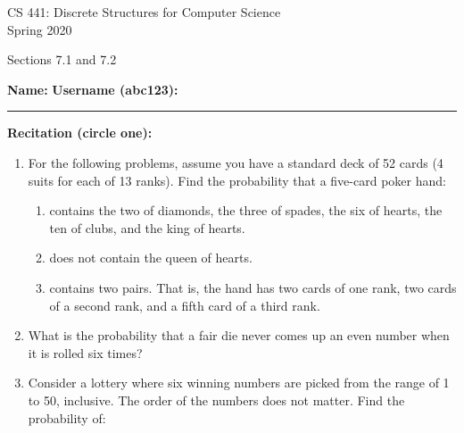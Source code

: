 \documentclass[12pt]{article}
\begin{document}
\begin{center}
CS 441: Discrete Structures for Computer Science \\
{\smaller[1] Spring 2020} \\

\vspace {0.25in}

Sections 7.1 and 7.2
\end{center}

\vspace{0.25in}

{\smaller[1]
\textbf{Name:} \hrulefill
\hspace{1em}
\textbf{Username (abc123):} \rule{1.25in}{0.4pt}

\null \textbf{Recitation (circle one):}
\hfill
}

\begin{enumerate} %


\item For the following problems, assume you have a standard deck of 52 cards (4
suits for each of 13 ranks). Find the probability that a five-card poker hand:
%
\begin{enumerate}[itemsep=\fill,after=\vfill\vfill] %

\item contains the two of diamonds, the three of spades, the six of hearts, the
ten of clubs, and the king of hearts.

\item does not contain the queen of hearts.

\item contains two pairs. That is, the hand has two cards of one rank, two cards of a second rank, and a fifth card of a third rank.

\end{enumerate} %



\item What is the probability that a fair die never comes up an even number when
it is rolled six times?

\vfill

\newpage



\item Consider a lottery where six winning numbers are picked from the range of
1 to 50, inclusive. The order of the numbers does not matter. Find the
probability of:
%
\begin{enumerate}[itemsep=\fill,after=\vfill] %


\end{enumerate}
\end{enumerate}
\end{document}
